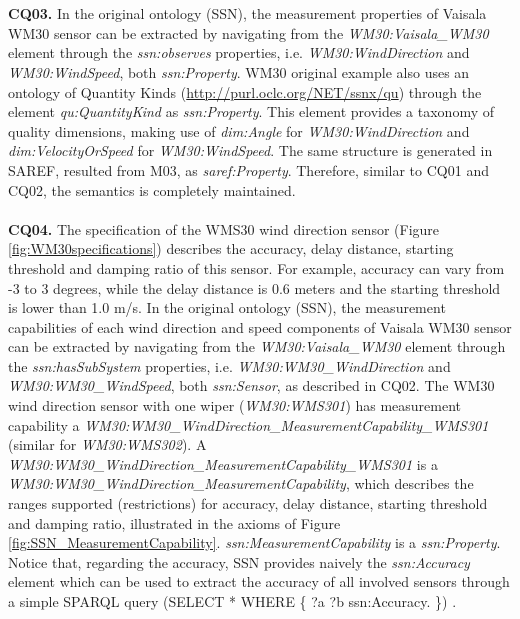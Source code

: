 \documentclass{sig-alternate-05-2015}
\begin{document}
\\\\\textbf{CQ03.} In the original ontology (SSN), the measurement properties of Vaisala WM30 sensor can be extracted by navigating from the \textit{WM30:\-Vaisala\-\_WM30} element through the \textit{ssn:\-observes} properties, i.e. \textit{WM30:\-WindDirection} and \textit{WM30:\-WindSpeed}, both \textit{ssn:\-Property}. WM30 original example also uses an ontology of Quantity Kinds (\url{http://purl.oclc.org/NET/ssnx/qu}) through the element \textit{qu:QuantityKind} as \textit{ssn:\-Property}. This element provides a taxonomy of quality dimensions, making use of \textit{dim:Angle} for \textit{WM30:\-WindDirection} and \textit{dim:VelocityOrSpeed} for \textit{WM30:\-WindSpeed}. The same structure is generated in SAREF, resulted from M03, as \textit{saref:\-Property}. Therefore, similar to CQ01 and CQ02, the semantics is completely maintained.
\\\\\textbf{CQ04.} The specification of the WMS30 wind direction sensor (Figure \ref{fig:WM30specifications}) describes the accuracy, delay distance, starting threshold and damping ratio of this sensor. For example, accuracy can vary from -3 to 3 degrees, while the delay distance is 0.6 meters and the starting threshold is lower than 1.0 m/s.  
In the original ontology (SSN), the measurement capabilities of each wind direction and speed components  of Vaisala WM30 sensor can be extracted by navigating from the \textit{WM30:\-Vaisala\-\_WM30} element through the \textit{ssn:\-hasSubSystem} properties, i.e. \textit{WM30:\-WM30\-\_Wind\-Direction} and \textit{WM30:\-WM30\-\_WindSpeed}, both \textit{ssn:\-Sensor}, as described in CQ02. The WM30 wind direction sensor with one wiper (\textit{WM30:\-WMS301}) has measurement capability a  \textit{WM30:\-WM30\-\_Wind\-Direction\-\_MeasurementCapability\-\_WMS301} (similar for \textit{WM30:\-WMS302}). A \textit{WM30:\-WM30\-\_Wind\-Direction\-\_MeasurementCapability\-\_WMS301} is a \textit{WM30:\-WM30\-\_Wind\-Direction\-\_MeasurementCapability}, which describes the ranges supported (restrictions) for accuracy, delay distance, starting threshold and damping ratio, illustrated in the axioms of Figure \ref{fig:SSN_MeasurementCapability}. \textit{ssn:\-MeasurementCapability} is a \textit{ssn:\-Property}.
Notice that, regarding the accuracy, SSN provides naively the \textit{ssn:\-Accuracy} element which can be used to extract the accuracy of all involved sensors through a simple SPARQL query (SELECT * WHERE \{ ?a ?b ssn:\-Accuracy. \}) .  
\end{document}
